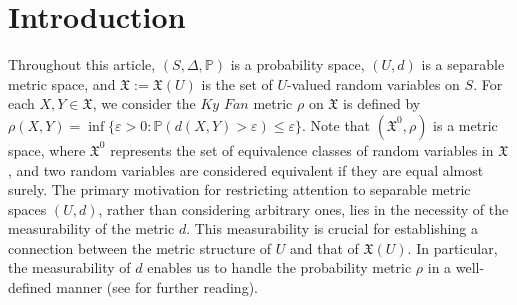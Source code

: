 \documentclass[reqno]{amsart}
\begin{document}
	
	\begin{abstract}
		Given a probability space $(S,\Delta, \mathbb{P})$ and a separable metric space $(U,d)$, the $Ky~Fan$ metric $\rho(X,Y)$ on the space $\mathfrak{X}^0$ of equivalence classes of random variables (w.r.t. almost sure equality) formed from the set $\mathfrak{X}(U)$ of $U$-valued random variables is given by $
		\rho(X,Y)=\inf \{\varepsilon>0:\mathbb{P}(d(X,Y)>\varepsilon)\leq\varepsilon\}.$ In this article, we primarily introduce the concept of rough ideal convergence in probability which serves as a unifying generalization of both ideal convergence of sequences in metric spaces and convergence of random variables in probability.
		We demonstrate that the rough ideal limit set is closed and bounded w.r.t. the $Ky~Fan$ metric $\rho$, and that, for a certain class of ideals, it forms an $F_{\sigma\delta}$ subset of $\mathfrak{X}^0$. In this process, we present the key concepts of strong and weak rough ideal cluster points in probability. It turns out that the set of strong rough ideal cluster points in probability is always closed, whereas the weak set is conditionally closed in the metric space ($\mathfrak{X}^0,\rho)$.  Finally, we obtain a characterization of a maximal admissible ideal in terms of the sets of strong rough ideal cluster points and the rough ideal limit set in probability.
	\end{abstract}
	
	
	\maketitle
	
	
	\section{Introduction}
	
	Throughout this article,  $(S,\Delta, \mathbb{P})$ is a probability space, $(U,d)$ is a separable metric space, and $\mathfrak{X}:=\mathfrak{X}(U)$ is the set of $U$-valued random variables on $S$. For each $X,Y\in \mathfrak{X}$, we consider the $Ky$ $Fan$ metric $\rho$ on $\mathfrak{X}$ is defined by $\rho(X,Y)=\inf \{\varepsilon>0:\mathbb{P}(d(X,Y)>\varepsilon)\leq\varepsilon\}$. Note that $(\mathfrak{X^0},\rho)$ is a metric space, where $\mathfrak{X^0}$ represents the set of equivalence classes of random variables in $\mathfrak{X}$, and two random variables are considered equivalent if they are equal almost surely. The primary motivation for restricting attention to separable metric spaces $(U,d)$, rather than considering arbitrary ones, lies in the necessity of the measurability of the metric $d$. This measurability is crucial for establishing a connection between the metric structure of $U$ and that of $\mathfrak{X}(U)$. In particular, the measurability of $d$ enables us to handle the probability metric $\rho$ in a well-defined manner (see \cite{rachev2013methods} for further reading).\\
	
\end{document}
